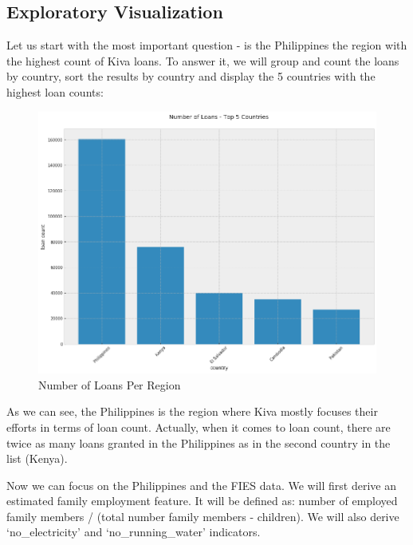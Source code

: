 \documentclass{article}
\begin{document}
\subsection{Exploratory Visualization}
Let us start with the most important question - is the Philippines the region with the highest count of Kiva loans. To answer it, we will group and count the loans by country, sort the results by country and display the 5 countries with the highest loan counts:

\begin{figure}[H]
\caption{Number of Loans Per Region}
\centering
\includegraphics[width = 0.7 \textwidth]{loan_regions}
\end{figure}

As we can see, the Philippines is the region where Kiva mostly focuses their efforts in terms of loan count. Actually, when it comes to loan count, there are twice as many loans granted in the Philippines as in the second country in the list (Kenya).

Now we can focus on the Philippines and the FIES data. We will first derive an estimated family employment feature. It will be defined as: number of employed family members / (total number family members - children). We will also derive ‘no\_electricity’ and ‘no\_running\_water’ indicators.
\end{document}
